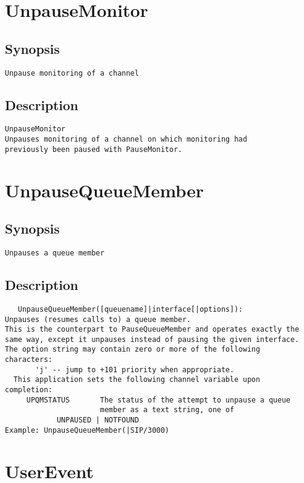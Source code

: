 \section{UnpauseMonitor}
\subsection{Synopsis}
\begin{verbatim}
Unpause monitoring of a channel
\end{verbatim}
\subsection{Description}
\begin{verbatim}
UnpauseMonitor
Unpauses monitoring of a channel on which monitoring had
previously been paused with PauseMonitor.

\end{verbatim}


\section{UnpauseQueueMember}
\subsection{Synopsis}
\begin{verbatim}
Unpauses a queue member
\end{verbatim}
\subsection{Description}
\begin{verbatim}
   UnpauseQueueMember([queuename]|interface[|options]):
Unpauses (resumes calls to) a queue member.
This is the counterpart to PauseQueueMember and operates exactly the
same way, except it unpauses instead of pausing the given interface.
The option string may contain zero or more of the following characters:
       'j' -- jump to +101 priority when appropriate.
  This application sets the following channel variable upon completion:
     UPQMSTATUS       The status of the attempt to unpause a queue 
                      member as a text string, one of
            UNPAUSED | NOTFOUND
Example: UnpauseQueueMember(|SIP/3000)

\end{verbatim}


\section{UserEvent}
